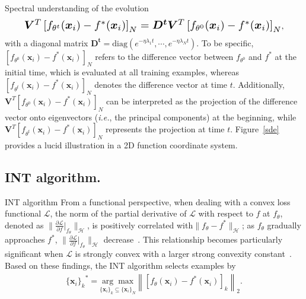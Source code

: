 \documentclass[aspectratio=169,xcolor=dvipsnames]{beamer}
\newcommand{\ie}{\textit{\fontspec{Times New Roman}i.e.}}
\begin{document}
\begin{frame}{Spectral understanding of the evolution}
\begin{eqnarray}\label{pdiff}
	\resizebox{.9\hsize}{!}{$\bm{V}^T\left[f_{\theta^t}(\bm{x}_i)-f^*(\bm{x}_i)\right]_N=\bm{D^t}\bm{V}^T\left[f_{\theta^0}(\bm{x}_i)-f^*(\bm{x}_i)\right]_N$},
\end{eqnarray}
with a diagonal matrix $\bm{D^t}=\text{diag}(e^{-\eta\lambda_1 t},\cdots,e^{-\eta\lambda_N t})$. To be specific, $\left[f_{\theta^0}(\bm{x}_i)-f^*(\bm{x}_i)\right]_N$ refers to the difference vector between $f_{\theta^0}$ and $f^*$ at the initial time, which is evaluated at all training examples, whereas $\left[f_{\theta^t}(\bm{x}_i)-f^*(\bm{x}_i)\right]_N$ denotes the difference vector at time $t$. Additionally, $\bm{V}^T\left[f_{\theta^0}(\bm{x}_i)-f^*(\bm{x}_i)\right]_N$ can be interpreted as the projection of the difference vector onto eigenvectors (\ie, the principal components) at the beginning, while $\bm{V}^T\left[f_{\theta^t}(\bm{x}_i)-f^*(\bm{x}_i)\right]_N$ represents the projection at time $t$. Figure~\ref{sde} provides a lucid illustration in a 2D function coordinate system.
\end{frame}

\subsection{INT algorithm.}
\begin{frame}{INT algorithm}
From a functional perspective, when dealing with a convex loss functional $\mathcal{L}$, the norm of the partial derivative of $\mathcal{L}$ with respect to $f$ at $f_\theta$, denoted as $\|\frac{\partial\mathcal{L}}{\partial f}|_{f_{\theta}}\|_\mathcal{H}$, is positively correlated with$\|f_\theta-f^*\|_\mathcal{H}$; as $f_\theta$ gradually approaches $f^*$, $\|\frac{\partial\mathcal{L}}{\partial f}|_{f_{\theta}}\|_\mathcal{H}$ decrease~\cite{boyd2004convex, coleman2012calculus}. This relationship becomes particularly significant when $\mathcal{L}$ is strongly convex with a larger strong convexity constant~\cite{kakade2008generalization,arjevani2016lower}. Based on these findings, the INT algorithm selects examples by
\begin{eqnarray}\label{intalg}
	{\{\bm{x}_i\}_k}^*=\underset{\{\bm{x}_i\}_k\subseteq\{\bm{x}_i\}_N}{\arg\max}\left\|\left[f_{\theta}(\bm{x}_i)-f^*(\bm{x}_i)\right]_k\right\|_2.
\end{eqnarray}
\end{frame}


\fi
\end{document}
